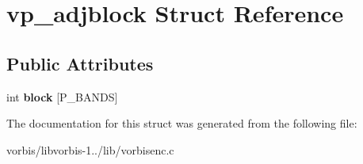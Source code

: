 \hypertarget{structvp__adjblock}{\section{vp\+\_\+adjblock Struct Reference}
\label{structvp__adjblock}
}
\subsection*{Public Attributes}
\begin{DoxyCompactItemize}
\item 
\hypertarget{structvp__adjblock_a2db822d13fa72c7f7808a99a34963d41}{int {\bfseries block} \mbox{[}P\+\_\+\+B\+A\+N\+D\+S\mbox{]}}\label{structvp__adjblock_a2db822d13fa72c7f7808a99a34963d41}

\end{DoxyCompactItemize}


The documentation for this struct was generated from the following file\+:\begin{DoxyCompactItemize}
\item 
vorbis/libvorbis-\/1../lib/vorbisenc.\+c\end{DoxyCompactItemize}
